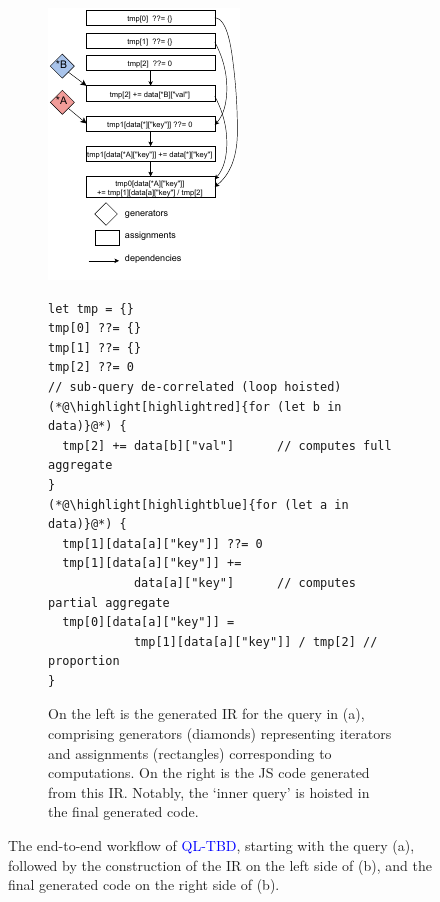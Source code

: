 \documentclass[runningheads]{llncs}
\newcommand{\lang}{\textcolor{blue}{QL-TBD}}
\begin{document}
\begin{figure}[t]
\begin{subfigure}{\textwidth}
\begin{minipage}{0.38\textwidth}
\centering
\includegraphics{images/intro_ir.pdf}
\end{minipage}
\begin{minipage}{0.62\textwidth}
\begin{lstlisting}[style=JavaScript,columns=flexible]
let tmp = {}
tmp[0] ??= {}
tmp[1] ??= {}                   
tmp[2] ??= 0                        
// sub-query de-correlated (loop hoisted)
(*@\highlight[highlightred]{for (let b in data)}@*) {
  tmp[2] += data[b]["val"]      // computes full aggregate
}
(*@\highlight[highlightblue]{for (let a in data)}@*) {
  tmp[1][data[a]["key"]] ??= 0
  tmp[1][data[a]["key"]] +=
            data[a]["key"]      // computes partial aggregate
  tmp[0][data[a]["key"]] = 
            tmp[1][data[a]["key"]] / tmp[2] // proportion
}
\end{lstlisting}
\end{minipage}
\caption{
On the left is the generated IR for the query in (a), comprising generators
(diamonds) representing iterators and assignments (rectangles) corresponding
to computations.
On the right is the JS code generated from this IR.
Notably, the `inner query' is hoisted in the final
generated code.
}\label{fig:ir_code}
\end{subfigure}

\caption{
The end-to-end workflow of \lang{}, starting with the query (a),
followed by the construction of the IR on the left side of (b), and the
final generated code on the right side of (b).
}\label{fig:intro}
\end{figure}
\end{document}

